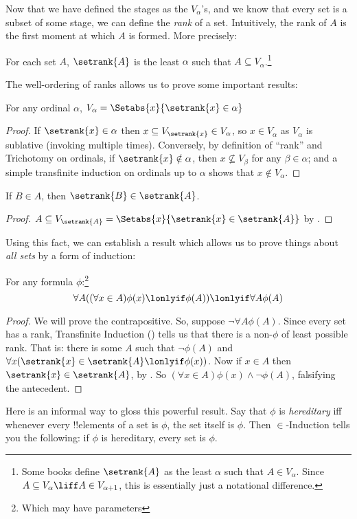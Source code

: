 \documentclass[../../../include/open-logic-section]{subfiles}
\begin{document}
Now that we have defined the stages as the $V_\alpha$'s, and we know that every set is a subset of some stage, we can define the \emph{rank} of a set. Intuitively, the rank of $A$ is the first moment at which $A$ is formed. More precisely:
\begin{defn}
	For each set $A$, $\setrank{A}$ is the least $\alpha$ such that $A \subseteq V_\alpha$.\footnote{Some books define $\setrank{A}$ as the least $\alpha$ such that $A \in V_\alpha$. Since $A \subseteq V_\alpha \liff A \in V_{\alpha+1}$, this is essentially just a notational difference.}
\end{defn}\noindent
The well-ordering of ranks allows us to prove some important results:
\begin{prop}
	For any ordinal $\alpha$, $V_\alpha = \Setabs{x}{\setrank{x} \in \alpha}$	
\end{prop}
\begin{proof}
	If $\setrank{x} \in \alpha$ then $x \subseteq V_{\setrank{x}} \in V_\alpha$, so $x \in V_\alpha$ as $V_\alpha$ is sublative (invoking  multiple times). Conversely, by definition of ``rank'' and Trichotomy on ordinals, if $\setrank{x} \notin  \alpha$, then $x \nsubseteq V_\beta$ for any $\beta \in \alpha$; and a simple transfinite induction on ordinals up to $\alpha$ shows that $x \notin V_\alpha$. 
\end{proof}
\begin{prop}
	If $B \in A$, then $\setrank{B} \in \setrank{A}$. 
\end{prop}
\begin{proof}
	$A \subseteq V_{\setrank{A}} = \Setabs{x}{\setrank{x} \in \setrank{A}}$ by .
\end{proof}\noindent
Using this fact, we can establish a result which allows us to prove things about \emph{all sets} by a form of induction:
\begin{thm} For any formula $\phi$:\footnote{Which may have parameters}
	$$\forall A((\forall x \in A)\phi(x) \lonlyif \phi(A)) \lonlyif \forall A \phi(A)$$
\end{thm}
\begin{proof}
	We will prove the contrapositive. So, suppose $\lnot \forall A \phi(A)$. Since every set has a rank, Transfinite Induction () tells us that there is a non-$\phi$ of least possible rank. That is: there is some $A$ such that $\lnot \phi(A)$ and $\forall x(\setrank{x} \in \setrank{A} \lonlyif \phi(x))$. Now if $x \in A$ then $\setrank{x} \in \setrank{A}$, by . So $(\forall x \in A)\phi(x) \land \lnot \phi(A)$, falsifying the antecedent.
\end{proof}\noindent
Here is an informal way to gloss this powerful result. Say that $\phi$ is \emph{hereditary} iff whenever every !!{element}s of a set is $\phi$, the set itself is $\phi$. Then $\in$-Induction tells you the following: if $\phi$ is hereditary, every set is $\phi$.
\end{document}
